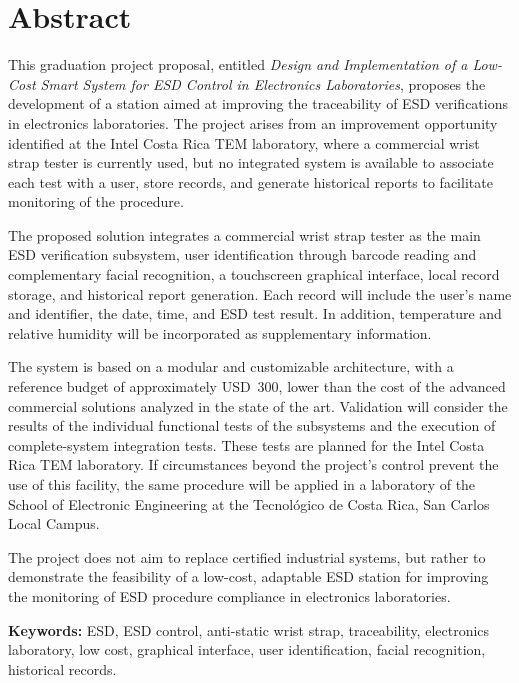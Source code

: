 \chapter*{Abstract}

This graduation project proposal, entitled \textit{Design and Implementation
of a Low-Cost Smart System for ESD Control in Electronics Laboratories},
proposes the development of a station aimed at improving the traceability of
ESD verifications in electronics laboratories. The project arises from an
improvement opportunity identified at the Intel Costa Rica TEM laboratory,
where a commercial wrist strap tester is currently used, but no integrated
system is available to associate each test with a user, store records, and
generate historical reports to facilitate monitoring of the procedure.

The proposed solution integrates a commercial wrist strap tester as the main
ESD verification subsystem, user identification through barcode reading and
complementary facial recognition, a touchscreen graphical interface, local
record storage, and historical report generation. Each record will include the
user's name and identifier, the date, time, and ESD test result. In addition,
temperature and relative humidity will be incorporated as supplementary
information.

The system is based on a modular and customizable architecture, with a
reference budget of approximately USD~300, lower than the cost of the advanced
commercial solutions analyzed in the state of the art. Validation will consider
the results of the individual functional tests of the subsystems and the
execution of complete-system integration tests. These tests are planned for the
Intel Costa Rica TEM laboratory. If circumstances beyond the project's control
prevent the use of this facility, the same procedure will be applied in a
laboratory of the School of Electronic Engineering at the Tecnológico de Costa
Rica, San Carlos Local Campus.

The project does not aim to replace certified industrial systems, but rather to
demonstrate the feasibility of a low-cost, adaptable ESD station for improving
the monitoring of ESD procedure compliance in electronics laboratories.

\textbf{Keywords:} ESD, ESD control, anti-static wrist strap, traceability,
electronics laboratory, low cost, graphical interface, user identification,
facial recognition, historical records.
